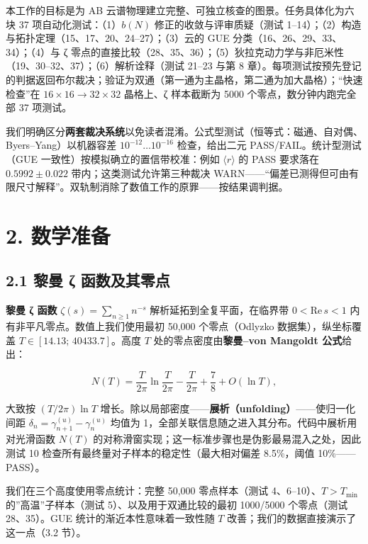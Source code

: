 \documentclass[
]{article}
\begin{document}
本工作的目标是为 AB 云谱物理建立完整、可独立核查的图景。任务具体化为六块
37 项自动化测试：（1）\(b(N)\) 修正的收敛与评审质疑（测试
1--14）；（2）构造与拓扑定理（15、17、20、24--27）；（3）云的 GUE
分类（16、26、29、33、34）；（4）与 ζ
零点的直接比较（28、35、36）；（5）狄拉克动力学与非厄米性（19、30--32、37）；（6）解析诠释（测试
21--23 与第 8
章）。每项测试按预先登记的判据返回布尔裁决；验证为双通（第一通为主晶格，第二通为加大晶格）；``快速检查''在
\(16\times16\to32\times32\) 晶格上、ζ 样本截断为 5000
个零点，数分钟内跑完全部 37 项测试。

我们明确区分\textbf{两套裁决系统}以免读者混淆。公式型测试（恒等式：磁通、自对偶、Byers--Yang）以机器容差
\(10^{-12}\dots10^{-16}\) 检查，给出二元 PASS/FAIL。统计型测试（GUE
一致性）按模拟确立的置信带校准：例如 \(\langle r\rangle\) 的 PASS
要求落在 \(0.5992\pm0.022\) 带内；这类测试允许第三种裁决
WARN------``偏差已测得但可由有限尺寸解释''。双轨制消除了数值工作的原罪------按结果调判据。

\section{2. 数学准备}\label{ux6570ux5b66ux51c6ux5907}

\subsection{2.1 黎曼 ζ
函数及其零点}\label{ux9eceux66fc-ux3b6-ux51fdux6570ux53caux5176ux96f6ux70b9}

\textbf{黎曼 ζ 函数} \(\zeta(s) = \sum_{n\ge1} n^{-s}\)
解析延拓到全复平面，在临界带 \(0<\mathrm{Re}\,s<1\)
内有非平凡零点。数值上我们使用最初 50,000 个零点（Odlyzko
数据集），纵坐标覆盖 \(T\in[14.13;\,40433.7]\)。高度 \(T\)
处的零点密度由\textbf{黎曼--von Mangoldt 公式}给出：

\[N(T) = \frac{T}{2\pi}\ln\frac{T}{2\pi} - \frac{T}{2\pi} + \frac{7}{8} + O(\ln T),\]

大致按 \((T/2\pi)\ln T\)
增长。除以局部密度------\textbf{展析（unfolding）}------使归一化间距
\(\delta_n = \gamma_{n+1}^{(u)} - \gamma_n^{(u)}\) 均值为
1，全部关联信息随之进入其分布。代码中展析用对光滑函数 \(N(T)\)
的对称滑窗实现；这一标准步骤也是伪影最易混入之处，因此测试 10
检查所有最终量对子样本的稳定性（最大相对偏差 8.5\%，阈值
10\%------PASS）。

我们在三个高度使用零点统计：完整 50,000 零点样本（测试
4、6--10）、\(T>T_{\min}\) 的''高温''子样本（测试
5）、以及用于双通比较的最初 1000/5000 个零点（测试 28、35）。GUE
统计的渐近本性意味着一致性随 \(T\) 改善；我们的数据直接演示了这一点（3.2
节）。
\end{document}
